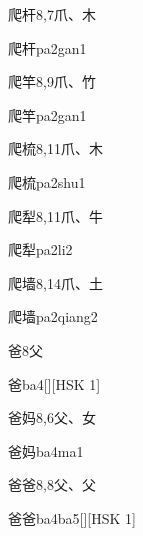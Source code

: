 \begin{Entry}{爬杆}{8,7}{⽖、⽊}
  \begin{Phonetics}{爬杆}{pa2gan1}
  \end{Phonetics}
\end{Entry}

\begin{Entry}{爬竿}{8,9}{⽖、⽵}
  \begin{Phonetics}{爬竿}{pa2gan1}
  \end{Phonetics}
\end{Entry}

\begin{Entry}{爬梳}{8,11}{⽖、⽊}
  \begin{Phonetics}{爬梳}{pa2shu1}
  \end{Phonetics}
\end{Entry}

\begin{Entry}{爬犁}{8,11}{⽖、⽜}
  \begin{Phonetics}{爬犁}{pa2li2}
  \end{Phonetics}
\end{Entry}

\begin{Entry}{爬墙}{8,14}{⽖、⼟}
  \begin{Phonetics}{爬墙}{pa2qiang2}
  \end{Phonetics}
\end{Entry}

\begin{Entry}{爸}{8}{⽗}
  \begin{Phonetics}{爸}{ba4}[][HSK 1]
  \end{Phonetics}
\end{Entry}

\begin{Entry}{爸妈}{8,6}{⽗、⼥}
  \begin{Phonetics}{爸妈}{ba4ma1}
  \end{Phonetics}
\end{Entry}

\begin{Entry}{爸爸}{8,8}{⽗、⽗}
  \begin{Phonetics}{爸爸}{ba4ba5}[][HSK 1]
  \end{Phonetics}
\end{Entry}

